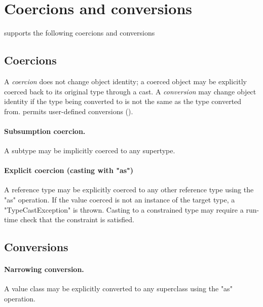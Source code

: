 \section{Coercions and conversions}
\label{XtenConversions}
\label{User-definedCoercions}

\XtenCurrVer{} supports the following coercions and conversions

\subsection{Coercions}

A {\em coercion} does not change object identity; a coerced object may
be explicitly coerced back to its original type through a cast. A {\em
  conversion} may change object identity if the type being converted
to is not the same as the type converted from. \Xten{} permits
user-defined conversions ().

\paragraph{Subsumption coercion.}
A subtype may be implicitly coerced to any supertype.

\paragraph{Explicit coercion (casting with \xcd"as")}
A reference type may be explicitly coerced to any other
reference type using the \xcd"as" operation.
If the value coerced is not an instance of the target type,
a \xcd"TypeCastException" is thrown.  Casting to a constrained
type may require a run-time check that the constraint is
satisfied.

\subsection{Conversions}

\paragraph{Narrowing conversion.}
A value class may be explicitly converted to any superclass
using the \xcd"as" operation.



